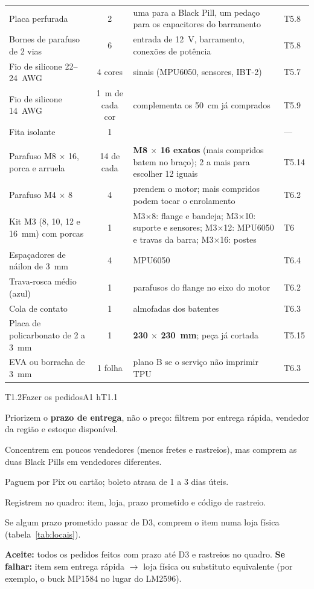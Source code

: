 \documentclass[11pt,a4paper]{article}
\newcommand{\flecha}{\ensuremath{\rightarrow}}
\begin{document}
\begin{xltabular}{\textwidth}{@{}>{\raggedright\arraybackslash}p{4.4cm}c>{\raggedright\arraybackslash}X>{\raggedright\arraybackslash}p{1.9cm}@{}}
Placa perfurada & 2 & uma para a Black Pill, um pedaço para os capacitores do barramento &
  T5.8 \\
Bornes de parafuso de 2 vias & 6 & entrada de 12~V, barramento, conexões de potência & T5.8 \\
Fio de silicone 22--24~AWG & 4 cores & sinais (MPU6050, sensores, IBT-2) & T5.7 \\
Fio de silicone 14~AWG & 1~m de cada cor & complementa os 50~cm já comprados & T5.9 \\
Fita isolante & 1 & & --- \\
\midrule
{} \\
Parafuso M8 $\times$ 16, porca e arruela & 14 de cada & \textbf{M8 $\times$ 16 exatos}
  (mais compridos batem no braço); 2 a mais para escolher 12 iguais & T5.14 \\
Parafuso M4 $\times$ 8 & 4 & prendem o motor; mais compridos podem tocar o enrolamento &
  T6.2 \\
Kit M3 (8, 10, 12 e 16~mm) com porcas & 1 & M3$\times$8: flange e bandeja; M3$\times$10:
  suporte e sensores; M3$\times$12: MPU6050 e travas da barra; M3$\times$16: postes & T6 \\
Espaçadores de náilon de 3~mm & 4 & MPU6050 & T6.4 \\
Trava-rosca médio (azul) & 1 & parafusos do flange no eixo do motor & T6.2 \\
Cola de contato & 1 & almofadas dos batentes & T6.3 \\
Placa de policarbonato de 2 a 3~mm & 1 & \textbf{230 $\times$ 230~mm}; peça já cortada &
  T5.15 \\
EVA ou borracha de 3~mm & 1 folha & plano B se o serviço não imprimir TPU & T6.3 \\
\end{xltabular}

\begin{tarefa}{T1.2}{Fazer os pedidos}{A}{1 h}{T1.1}
\begin{passos}
  \item Priorizem o \textbf{prazo de entrega}, não o preço: filtrem por entrega rápida,
    vendedor da região e estoque disponível.
  \item Concentrem em poucos vendedores (menos fretes e rastreios), mas comprem as duas
    Black Pills em vendedores diferentes.
  \item Paguem por Pix ou cartão; boleto atrasa de 1 a 3 dias úteis.
  \item Registrem no quadro: item, loja, prazo prometido e código de rastreio.
  \item Se algum prazo prometido passar de D3, comprem o item numa loja física
    (tabela~\ref{tab:locais}).
\end{passos}
\textbf{Aceite:} todos os pedidos feitos com prazo até D3 e rastreios no quadro.\quad
\textbf{Se falhar:} item sem entrega rápida \flecha{} loja física ou substituto equivalente
(por exemplo, o buck MP1584 no lugar do LM2596).
\end{tarefa}
\end{document}
